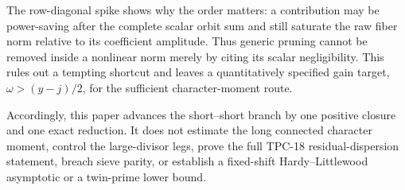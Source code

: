 The row-diagonal spike shows why the order matters: a contribution may
be power-saving after the complete scalar orbit sum and still saturate
the raw fiber norm relative to its coefficient amplitude.  Thus generic
pruning cannot be removed inside a nonlinear norm merely by citing its
scalar negligibility.  This rules out a
tempting shortcut and leaves a quantitatively specified gain target,
\(\omega>(y-j)/2\), for the sufficient character-moment route.

Accordingly, this paper advances the short--short branch by one positive
closure and one exact reduction.  It does not estimate the long
connected character moment, control the large-divisor legs, prove the
full TPC-18 residual-dispersion statement, breach sieve parity, or
establish a fixed-shift Hardy--Littlewood asymptotic or a twin-prime
lower bound.

